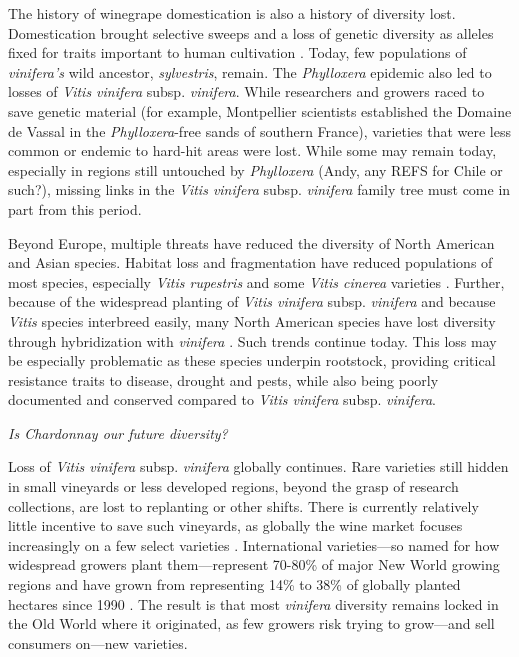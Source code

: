 \documentclass[11pt]{article}
\begin{document}
The history of winegrape domestication is also a history of diversity lost. Domestication brought selective sweeps and a loss of genetic diversity as alleles fixed for traits important to human cultivation \citep{dong2023}. Today, few populations of \emph{vinifera's} wild ancestor, \emph{sylvestris}, remain. The \emph{Phylloxera} epidemic also led to losses of \emph{Vitis vinifera} subsp. \emph{vinifera}. While researchers and growers raced to save genetic material (for example, Montpellier scientists established the Domaine de Vassal in the \emph{Phylloxera}-free sands of southern France), varieties that were less common or endemic to hard-hit areas were lost. While some may remain today, especially in regions still untouched by \emph{Phylloxera} (Andy, any REFS for Chile or such?), missing links in the  \emph{Vitis vinifera} subsp. \emph{vinifera} family tree \citep[e.g.,][]{merlotparents} must come in part from this period. 

Beyond Europe, multiple threats have reduced the diversity of North American and Asian species. Habitat loss and fragmentation have reduced populations of most species, especially \emph{Vitis rupestris} and some \emph{Vitis cinerea} varieties \citep{heinitz2019}. Further, because of the widespread planting of  \emph{Vitis vinifera} subsp. \emph{vinifera} and because \emph{Vitis} species interbreed easily, many North American species have lost diversity through hybridization with \emph{vinifera} \citep{heinitz2019}. Such trends continue today. This loss may be especially problematic as these species underpin rootstock, providing critical resistance traits to disease, drought and pests, while also being poorly documented and conserved compared to \emph{Vitis vinifera} subsp. \emph{vinifera}. 

\emph{Is Chardonnay our future diversity?}

Loss of \emph{Vitis vinifera} subsp. \emph{vinifera} globally continues. Rare varieties still hidden in small vineyards or less developed regions, beyond the grasp of research collections, are lost to replanting or other shifts. There is currently relatively little incentive to save such vineyards, as globally the wine market focuses increasingly on a few select varieties \citep{Wolkovich2017,andersonnelgen2021}. International varieties---so named for how widespread growers plant them---represent 70-80\% of major New World growing regions \citep{Wolkovich2017} and have grown from representing 14\% to 38\% of globally planted hectares since 1990 \citep{andersonnelgen2021}. The result is that most \emph{vinifera} diversity remains locked in the Old World where it originated, as few growers risk trying to grow---and sell consumers on---new varieties.  %
\end{document}
